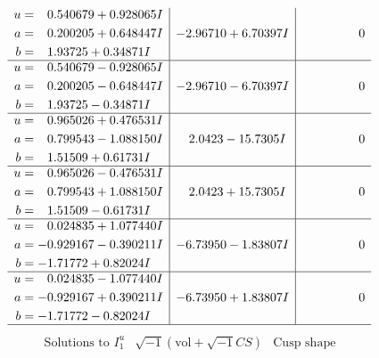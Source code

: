 \documentclass[1p]{elsarticle_modified}
\theoremstyle{definition}
\newcommand{\I}{\sqrt{-1}}
\begin{document}
$$\begin{array}{c|c|c}
\begin{aligned}
u &= \phantom{-}0.540679 + 0.928065 I \\
a &= \phantom{-}0.200205 + 0.648447 I \\
b &= \phantom{-}1.93725 + 0.34871 I\end{aligned}
 & -2.96710 + 6.70397 I & \phantom{-0.000000 } 0 \\ \hline\begin{aligned}
u &= \phantom{-}0.540679 - 0.928065 I \\
a &= \phantom{-}0.200205 - 0.648447 I \\
b &= \phantom{-}1.93725 - 0.34871 I\end{aligned}
 & -2.96710 - 6.70397 I & \phantom{-0.000000 } 0 \\ \hline\begin{aligned}
u &= \phantom{-}0.965026 + 0.476531 I \\
a &= \phantom{-}0.799543 - 1.088150 I \\
b &= \phantom{-}1.51509 + 0.61731 I\end{aligned}
 & \phantom{-}2.0423 - 15.7305 I & \phantom{-0.000000 } 0 \\ \hline\begin{aligned}
u &= \phantom{-}0.965026 - 0.476531 I \\
a &= \phantom{-}0.799543 + 1.088150 I \\
b &= \phantom{-}1.51509 - 0.61731 I\end{aligned}
 & \phantom{-}2.0423 + 15.7305 I & \phantom{-0.000000 } 0 \\ \hline\begin{aligned}
u &= \phantom{-}0.024835 + 1.077440 I \\
a &= -0.929167 - 0.390211 I \\
b &= -1.71772 + 0.82024 I\end{aligned}
 & -6.73950 - 1.83807 I & \phantom{-0.000000 } 0 \\ \hline\begin{aligned}
u &= \phantom{-}0.024835 - 1.077440 I \\
a &= -0.929167 + 0.390211 I \\
b &= -1.71772 - 0.82024 I\end{aligned}
 & -6.73950 + 1.83807 I & \phantom{-0.000000 } 0\\
 \hline 
 \end{array}$$\newpage$$\begin{array}{c|c|c}  
\text{Solutions to }I^u_{1}& \I (\text{vol} + \sqrt{-1}CS) & \text{Cusp shape}\\

\end{array}$$
\end{document}
